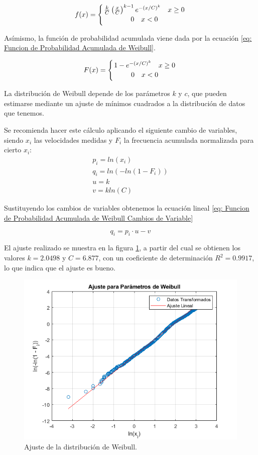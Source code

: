\documentclass{IEEEtran}
\begin{document}
\begin{equation}
    f(x) = \left\{ \frac{k}{C} \left( \frac{x}{C} \right)^{k - 1} e^{-(x/C)^k} \quad x \geq 0 \atop 0 \quad x < 0 \right.
    \label{eq: Funcion de Densidad de Probabilidad de Weibull}
\end{equation}

Asímismo, la función de probabilidad acumulada viene dada por la ecuación \ref{eq: Funcion de Probabilidad Acumulada de Weibull}.

\begin{equation}
    F(x) = \left\{ 1 - e^{-(x/C)^k} \quad x \geq 0 \atop 0 \quad x < 0 \right.
    \label{eq: Funcion de Probabilidad Acumulada de Weibull}
\end{equation}

La distribución de Weibull depende de los parámetros $k$ y $c$, que pueden estimarse mediante un ajuste de mínimos cuadrados a la distribución de datos que tenemos.

Se recomienda hacer este cálculo aplicando el siguiente cambio de variables, siendo $x_i$ las velocidades medidas y $F_i$ la frecuencia acumulada normalizada para cierto $x_i$:
\begin{gather*}
    p_i = ln(x_i) \\
    q_i = ln(- ln(1 - F_i)) \\
    u = k \\
    v = k ln(C)
\end{gather*}

Sustituyendo los cambios de variables obtenemos la ecuación lineal \ref{eq: Funcion de Probabilidad Acumulada de Weibull Cambios de Variable}

\begin{equation}
    q_i = p_i \cdot u - v
    \label{eq: Funcion de Probabilidad Acumulada de Weibull Cambios de Variable}
\end{equation}

El ajuste realizado se muestra en la figura \ref{fig: Ajuste de la distribución de Weibull}, a partir del cual se obtienen los valores $k = 2.0498$ y $C = 6.877$, con un coeficiente de determinación $R^2 = 0.9917$, lo que indica que el ajuste es bueno.

\begin{figure}[h]
    \centering
    \includegraphics[width = 0.5 \textwidth]{Imagenes/Ajuste de Distribucion de Weibull.png}
    \caption{Ajuste de la distribución de Weibull.}
    \label{fig: Ajuste de la distribución de Weibull}
\end{figure}
\end{document}
